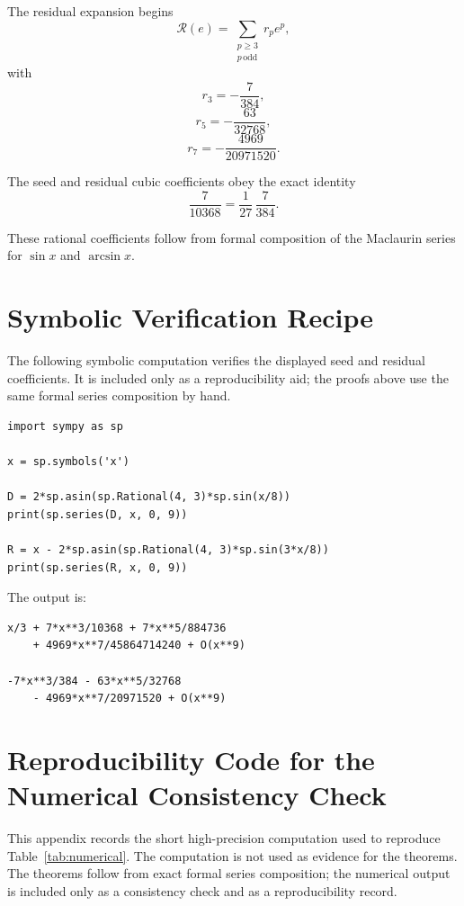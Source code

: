 \documentclass[11pt]{article}
\theoremstyle{remark}
\newcommand{\Rop}{\mathscr{R}}
\begin{document}
The residual expansion begins
\[
\Rop(e)
=
\sum_{\substack{p\ge 3\\ p\,\mathrm{odd}}}r_p e^p,
\]
with
\[
r_3=-\frac{7}{384},
\]
\[
r_5=-\frac{63}{32768},
\]
\[
r_7=-\frac{4969}{20971520}.
\]

The seed and residual cubic coefficients obey the exact identity
\[
\frac{7}{10368}=\frac1{27}\,\frac7{384}.
\]

These rational coefficients follow from formal composition of the Maclaurin series for
$\sin x$ and $\arcsin x$.

\section{Symbolic Verification Recipe}
\label{app:symbolic-verification}

The following symbolic computation verifies the displayed seed and residual
coefficients.  It is included only as a reproducibility aid; the proofs above use
the same formal series composition by hand.

\begin{verbatim}
import sympy as sp

x = sp.symbols('x')

D = 2*sp.asin(sp.Rational(4, 3)*sp.sin(x/8))
print(sp.series(D, x, 0, 9))

R = x - 2*sp.asin(sp.Rational(4, 3)*sp.sin(3*x/8))
print(sp.series(R, x, 0, 9))
\end{verbatim}

The output is:

\begin{verbatim}
x/3 + 7*x**3/10368 + 7*x**5/884736
    + 4969*x**7/45864714240 + O(x**9)

-7*x**3/384 - 63*x**5/32768
    - 4969*x**7/20971520 + O(x**9)
\end{verbatim}

\section{Reproducibility Code for the Numerical Consistency Check}
\label{app:numerical-code}

This appendix records the short high-precision computation used to reproduce
Table~\ref{tab:numerical}.  The computation is not used as evidence for the
theorems.  The theorems follow from exact formal series composition; the
numerical output is included only as a consistency check and as a reproducibility
record.
\end{document}
